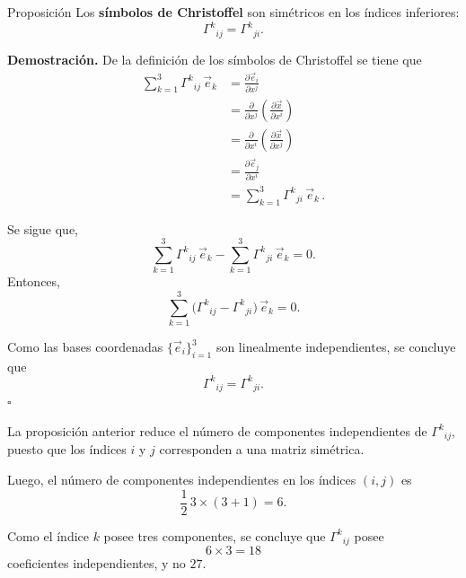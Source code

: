 \documentclass[../apunte_mecanica_clasica.tex]{subfiles}%
\begin{document}
\begin{apuntebloque}{Proposición}
Los \textbf{símbolos de Christoffel} son simétricos en los índices inferiores:
\begin{equation*}
    \Gamma^k{}_{ij} = \Gamma^k{}_{ji}.
\end{equation*}

\textbf{Demostración.}  
De la definición de los símbolos de Christoffel se tiene que
\begin{align*}
    \sum_{k=1}^3 \Gamma^k{}_{ij}\,\vec{e}_k 
    &= \frac{\partial \vec{e}_i}{\partial x^j} \\
    &= \frac{\partial}{\partial x^j}\!\left(\frac{\partial \vec{x}}{\partial x^i}\right) \\
    &= \frac{\partial}{\partial x^i}\!\left(\frac{\partial \vec{x}}{\partial x^j}\right) \\
    &= \frac{\partial \vec{e}_j}{\partial x^i} \\
    &= \sum_{k=1}^3 \Gamma^k{}_{ji}\,\vec{e}_k \,.
\end{align*}

Se sigue  que,
\begin{equation*}
    \sum_{k=1}^3 \Gamma^k{}_{ij}\,\vec{e}_k - \sum_{k=1}^3 \Gamma^k{}_{ji}\,\vec{e}_k= 0.
\end{equation*}
Entonces, 
\begin{equation*}
    \sum_{k=1}^3 \big(\Gamma^k{}_{ij} - \Gamma^k{}_{ji}\big)\,\vec{e}_k = 0.
\end{equation*}

Como las bases coordenadas $\{\vec{e}_i\}_{i=1}^3$ son linealmente independientes, 
se concluye que
\begin{equation*}
    \Gamma^k{}_{ij} = \Gamma^k{}_{ji}.
\end{equation*}
\hfill $\square$
\end{apuntebloque}

La proposición anterior reduce el número de componentes 
independientes de $\Gamma^k{}_{ij}$, puesto que los índices 
$i$ y $j$ corresponden a una matriz simétrica.  

Luego, el número de componentes independientes en los 
índices $(i,j)$ es
\begin{equation*}
    \frac{1}{2}\, 3 \times (3+1) = 6.
\end{equation*}

Como el índice $k$ posee tres componentes, se concluye que 
$\Gamma^k{}_{ij}$ posee
\begin{equation*}
    6 \times 3 = 18
\end{equation*}
coeficientes independientes, y no $27$.
\end{document}
